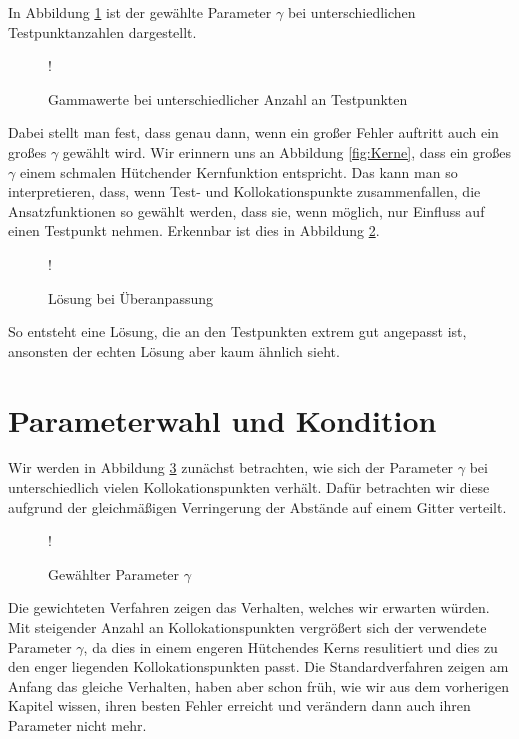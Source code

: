 In Abbildung \ref{fig:testpunkte-gamma} ist der gewählte Parameter $\gamma$ bei unterschiedlichen Testpunktanzahlen dargestellt.
\begin{figure}[ht]
\centering
\resizebox {\columnwidth} {!} {

}
\caption{Gammawerte bei unterschiedlicher Anzahl an Testpunkten}
\label{fig:testpunkte-gamma}
\end{figure}
Dabei stellt man fest, dass genau dann, wenn ein großer Fehler auftritt auch ein großes $\gamma$ gewählt wird. Wir erinnern uns an Abbildung \ref{fig:Kerne}, dass ein großes $\gamma$ einem schmalen \glqq Hütchen\grqq  der Kernfunktion entspricht. Das kann man so interpretieren, dass, wenn Test- und Kollokationspunkte zusammenfallen, die Ansatzfunktionen so gewählt werden, dass sie, wenn möglich, nur Einfluss auf einen Testpunkt nehmen. Erkennbar ist dies in Abbildung \ref{fig:overfitting}.
\begin{figure}[ht]
\centering
\resizebox {\columnwidth} {!} {

}
\caption{Lösung bei Überanpassung}
\label{fig:overfitting}
\end{figure}

So entsteht eine Lösung, die an den Testpunkten extrem gut angepasst ist, ansonsten der echten Lösung aber kaum ähnlich sieht.

\section{Parameterwahl und Kondition}
Wir werden in Abbildung \ref{fig:gamma} zunächst betrachten, wie sich der Parameter $\gamma$ bei unterschiedlich vielen Kollokationspunkten verhält. Dafür betrachten wir diese aufgrund der gleichmäßigen Verringerung der Abstände auf einem Gitter verteilt. 

\begin{figure}[ht]
\centering
\resizebox {\columnwidth} {!} {

}
\caption{Gewählter Parameter $\gamma$}
\label{fig:gamma}
\end{figure}

Die gewichteten Verfahren zeigen das Verhalten, welches wir erwarten würden. Mit steigender Anzahl an Kollokationspunkten vergrößert sich der verwendete Parameter $\gamma$, da dies in einem engeren \glqq Hütchen\grqq  des Kerns resulitiert und dies zu den enger liegenden Kollokationspunkten passt. Die Standardverfahren zeigen am Anfang das gleiche Verhalten, haben aber schon früh, wie wir aus dem vorherigen Kapitel wissen, ihren besten Fehler erreicht und verändern dann auch ihren Parameter nicht mehr.

